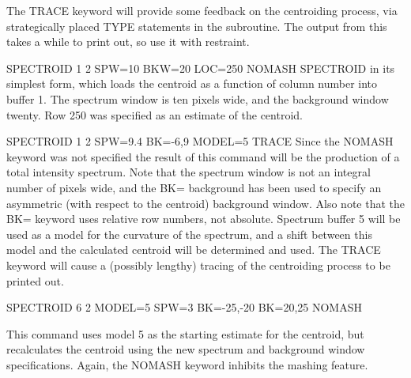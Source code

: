 The TRACE keyword will provide some feedback on the centroiding process,
via strategically placed TYPE statements in the subroutine. The output from
this takes a while to print out, so use it with restraint.

\begin{example}
  \item[SPECTROID 1 2 SPW=10 BKW=20 LOC=250 NOMASH\hfill]{ SPECTROID in its
       simplest form, which loads the centroid as a function of column
       number into buffer 1. The spectrum window is ten pixels wide, and
       the background window twenty. Row 250 was specified as an estimate
       of the centroid.}

  \item[SPECTROID 1 2 SPW=9.4 BK=-6,9 MODEL=5 TRACE\hfill]{ Since the NOMASH
       keyword was not specified the result of this command will be the
       production of a total intensity spectrum.  Note that the spectrum
       window is not an integral number of pixels wide, and the BK=
       background has been used to specify an asymmetric (with respect to
       the centroid) background window.  Also note that the BK= keyword
       uses relative row numbers, not absolute.  Spectrum buffer 5 will be
       used as a model for the curvature of the spectrum, and a shift
       between this model and the calculated centroid will be determined
       and used.  The TRACE keyword will cause a (possibly lengthy) tracing
       of the centroiding process to be printed out.}

  \item[SPECTROID 6 2 MODEL=5 SPW=3 BK=-25,-20 BK=20,25 NOMASH\hfill]
  \item{This command uses model 5 as the starting estimate for the
       centroid, but recalculates the centroid using the new spectrum and
       background window specifications.  Again, the NOMASH keyword
       inhibits the mashing feature.}
\end{example}

